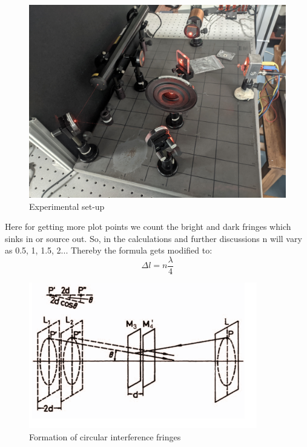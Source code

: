 \begin{figure}
	\centering
	\includegraphics[width=0.7\linewidth]{SGCAM_20230117_144136325}
	\caption{Experimental set-up}
	\label{fig:sgcam20230117144136325}
\end{figure}
Here for getting more plot points we count
the bright and dark fringes which sinks in or
source out. So, in the calculations and further
discussions n will vary as 0.5, 1, 1.5, 2... Thereby
the formula gets modified to:
\begin{equation}
	\Delta l = n \dfrac{\lambda}{4}
\end{equation}

\begin{figure}
	\centering
	\includegraphics[width=0.7\linewidth]{mich-2}
	\caption{Formation of circular interference fringes}
	\label{fig:mich-2}
\end{figure}

